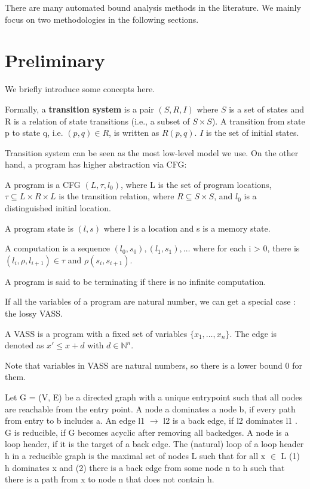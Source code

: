 \begin{survey}
There are many automated bound analysis methods in the literature. We mainly focus on two methodologies in the following sections.

\section{Preliminary}

We briefly introduce some concepts here.

\begin{definition}
  Formally, a {\textbf{transition system}} is a pair $(S, R, I)$ where $S$ is a set of states and R is a relation of state transitions (i.e., a subset of $S \times S$). A transition from state p to state q, i.e. $(p, q) \in R$, is written as $R(p,q)$. $I$ is the set of initial states.
\end{definition}

Transition system can be seen as the most low-level model we use. On the other hand, a program has higher abstraction via CFG:

\begin{definition}[Program]
  A program is a CFG $(L, \tau, l_0)$, where L is the set of program locations, $\tau \subseteq L \times R \times L$ is the transition relation, where $R \subseteq S \times S$, and $l_0$ is a distinguished initial location.
  
  A program state is $(l, s)$ where l is a location and s is a memory state.
  
  A computation is a sequence $(l_0, s_0), (l_1, s_1), \ldots$ where for each i > 0, there is $(l_i, \rho, l_{i + 1}) \in \tau$ and $\rho (s_i, s_{i + 1})$.
  
  A program is said to be terminating if there is no infinite computation.
\end{definition}

If all the variables of a program are natural number, we can get a special case : the lossy VASS.

\begin{definition}
  A VASS is a program with a fixed set of variables $\{ x_1, \ldots, x_n \}$. The edge is denoted as $x' \leqslant x + d$ with $d \in \mathbb{N}^n$.
\end{definition}

Note that variables in VASS are natural numbers, so there is a lower bound 0 for them.

\begin{definition}[Loop]
  Let G = (V, E) be a directed graph with a unique entrypoint such that all nodes are reachable from the entry point. A node a dominates a node b, if every path from entry to b includes a. An edge l1 $\rightarrow$ l2 is a back edge, if l2 dominates l1 . G is reducible, if G becomes acyclic after removing all backedges. A node is a loop header, if it is the target of a back edge. The (natural) loop of a loop header h in a reducible graph is the maximal set of nodes L such that for all x $\in$ L (1) h dominates x and (2) there is a back edge from some node n to h such that there is a path from x to node n that does not contain h.
  

\end{definition}
\end{survey}
